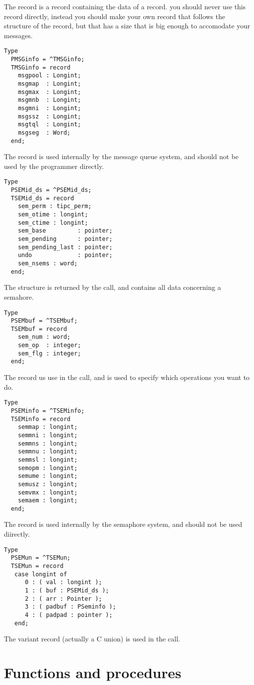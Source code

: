 The  record is a record containing the data of a record. you
should never use this record directly, instead you should make your own
record that follows the structure of the  record, but that has
a size that is big enough to accomodate your messages.
\begin{verbatim}
Type
  PMSGinfo = ^TMSGinfo;
  TMSGinfo = record
    msgpool : Longint;
    msgmap  : Longint;
    msgmax  : Longint;
    msgmnb  : Longint;
    msgmni  : Longint;
    msgssz  : Longint;
    msgtql  : Longint;
    msgseg  : Word;
  end;
\end{verbatim}
The   record is used internally by the message queue system,
and should not be used by the programmer directly.
\begin{verbatim}
Type
  PSEMid_ds = ^PSEMid_ds;
  TSEMid_ds = record
    sem_perm : tipc_perm;
    sem_otime : longint;
    sem_ctime : longint;
    sem_base         : pointer;
    sem_pending      : pointer;
    sem_pending_last : pointer;
    undo             : pointer;
    sem_nsems : word;
  end;
\end{verbatim}
The  structure is returned by the  call, and
contains all data concerning a semahore.
\begin{verbatim}
Type
  PSEMbuf = ^TSEMbuf;
  TSEMbuf = record
    sem_num : word;
    sem_op  : integer;
    sem_flg : integer;
  end;
\end{verbatim}
The  record us use in the  call, and is used to
specify which operations you want to do.
\begin{verbatim}
Type
  PSEMinfo = ^TSEMinfo;
  TSEMinfo = record
    semmap : longint;
    semmni : longint;
    semmns : longint;
    semmnu : longint;
    semmsl : longint;
    semopm : longint;
    semume : longint;
    semusz : longint;
    semvmx : longint;
    semaem : longint;
  end;
\end{verbatim}
The  record is used internally by the semaphore system, and
should not be used diirectly.
\begin{verbatim}
Type
  PSEMun = ^TSEMun;
  TSEMun = record
   case longint of
      0 : ( val : longint );
      1 : ( buf : PSEMid_ds );
      2 : ( arr : Pointer );
      3 : ( padbuf : PSeminfo );
      4 : ( padpad : pointer );
   end;
\end{verbatim}
The  variant record (actually a C union) is used in the
 call.
 
\section{Functions and procedures}

